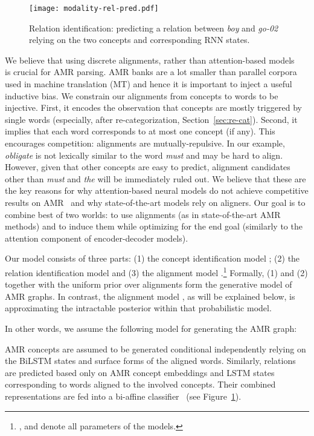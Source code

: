 \documentclass[11pt,a4paper]{article}
\begin{document}
\begin{figure}[h!]
\centering
\texttt{[image: modality-rel-pred.pdf]}
\vspace{-3ex}
\caption{Relation identification: predicting a relation between  {\it boy} and {\it go-02} relying on 
the two concepts and corresponding RNN states.}
\label{fig:rel-pred}
\end{figure}
We believe that using discrete alignments, rather than attention-based models ~\cite{bahdanau2014neural} is crucial for AMR parsing. AMR banks are a lot smaller than parallel corpora used in machine translation (MT) and hence it is important to inject a useful inductive bias. 
We constrain our alignments from concepts to words to be injective.
First, it encodes the observation that
concepts are mostly triggered by single words (especially, after re-categorization, Section~\ref{sec:re-cat}). 
Second, it implies that each word corresponds to at most one concept (if any). This encourages competition: alignments are mutually-repulsive. In our example, \textit{obligate} is not lexically similar to the word \textit{must} and may be hard to align. 
However, given that other concepts are easy to predict, 
alignment candidates other than
{\it must} and {\it the} will be immediately ruled out.
We believe that these are the key reasons for why attention-based neural models do not achieve competitive results on AMR~\cite{konstas-EtAl:2017:Long} and why state-of-the-art models rely on aligners. Our goal is to combine best of two worlds: to use alignments (as in state-of-the-art AMR methods) and to induce them while optimizing for the end goal (similarly to the attention component of encoder-decoder models). 




Our model consists of three parts: (1) the concept identification model
; (2) the relation identification model 
and (3) the alignment model .\footnote{,  and  denote all parameters of the models.}
Formally, (1) and (2) together with the uniform prior over alignments  form the generative model of AMR graphs. In contrast,  the alignment model , as will be explained below, is approximating the intractable posterior  within that probabilistic model.



In other words, we assume the following model for generating the AMR graph: 

AMR concepts are assumed to be generated conditional independently relying on the BiLSTM states and surface forms of the aligned words. Similarly, relations are predicted based only on AMR concept embeddings and LSTM states corresponding to words aligned to the involved concepts. Their combined representations are fed into a bi-affine classifier~\cite{Biaffine} (see Figure~\ref{fig:rel-pred}). 
\end{document}
